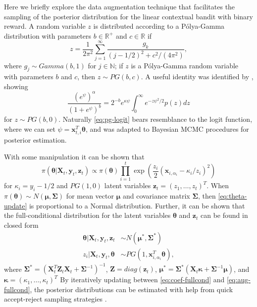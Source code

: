 \documentclass[12pt]{article}
\begin{document}
Here we briefly explore the data augmentation technique that facilitates the 
sampling of the posterior distribution for the linear contextual bandit with
binary reward.
A random variable $z$ is distributed according to a P\'olya-Gamma distribution
with parameters $b \in \mathbb{R}^{+}$ and $c \in \mathbb{R}$ if 
\begin{equation}
z = \frac{1}{2\pi^2} \sum_{j = 1}^\infty \frac{g_k}{(j - 1/2)^2 + c^2/(4\pi^2)},
\end{equation}
where 
$g_j \sim Gamma(b,1)$ 
for $j \in \mathbb{N}$; if $z$ is a P\'olya-Gamma random variable with parameters
$b$ and $c$, then $z \sim PG(b,c)$. 
A useful identity was identified by \cite{polson2013bayesian}, showing
\begin{equation}
\frac{(e^\psi)^\alpha}{(1 + e^\psi)^b}
= 2^{-b}e^{\kappa\psi}
\int_0^\infty e^{-z\psi^2 / 2} p(z) dz
\label{eq:pg-logit}
\end{equation}
for $z \sim PG(b,0)$.
Naturally \eqref{eq:pg-logit} bears resemblance to the logit function, where we
can set $\psi = \bm{x}_{t,i}^T\bm{\theta}$, and was adapted to Bayesian MCMC 
procedures for posterior estimation.

With some manipulation it can be shown that
\begin{equation}
\pi(\bm{\theta} \vert \bm{X}_t, \bm{y}_t, \bm{z}_t)
\propto \pi(\bm{\theta})
\prod_{i = 1}^t \exp(\frac{z_i}{2} (\bm{x}_{i,\alpha_i} - \kappa_i/z_i)^2)
\label{eq:theta-update}
\end{equation}
for $\kappa_i = y_i - 1/2$ and $PG(1,0)$ latent variables 
$\bm{z}_t = (z_1, \ldots, z_t)^T$. 
When $\pi(\bm{\theta}) \sim N(\bm{\mu}, \bm{\Sigma})$ 
for mean vector $\bm{\mu}$ and covariance matrix $\bm{\Sigma}$, then
\eqref{eq:theta-update} is proportional to a Normal distribution.
Further, it can be shown that the full-conditional distribution for the latent
variables $\bm{\theta}$ and $\bm{z}_t$ can be found in closed form
\begin{align}
\bm{\theta} \vert \bm{X}_t, \bm{y}_t, \bm{z}_t & 
\sim N(\bm{\mu}^*, \bm{\Sigma}^*) \label{eq:coef-fullcond}\\
z_i \vert \bm{X}_t, \bm{y}_t, \bm{\theta} & 
\sim PG(1, \bm{x}_{i,\alpha_i}^T \bm{\theta}) \label{eq:aug-fullcond},
\end{align}
where 
$\bm{\Sigma}^* = (\bm{X}_t^T \bm{Z}_t \bm{X}_t + \bm{\Sigma}^{-1})^{-1}$,
$\bm{Z} = diag(\bm{z}_t)$,
$\bm{\mu}^* = \bm{\Sigma}^*(\bm{X}_t \bm{\kappa} + \bm{\Sigma}^{-1}\bm{\mu})$,
and 
$\bm{\kappa} = (\kappa_1, \ldots, \kappa_t)^T$
By iteratively updating between \eqref{eq:coef-fullcond} and 
\eqref{eq:aug-fullcond}, the posterior distributions can be estimated with 
help from quick accept-reject sampling strategies \cite{makalicpkg}.
\end{document}
